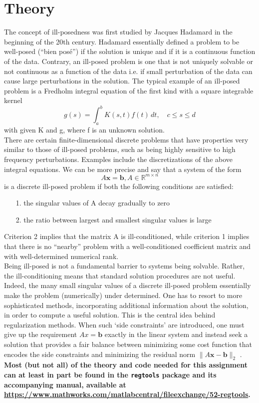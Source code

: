 \documentclass[12pt]{article}
\newcommand{\mbf}[1]{\mathbf{#1}}
\begin{document}
\section{Theory}
The concept of ill-posedness was first studied by Jacques Hadamard in the beginning of the 20th century. Hadamard essentially defined a problem to be well-posed (“bien posé”) if the solution is unique and if it is a continuous function of the data. Contrary, an ill-posed problem is one that is not
uniquely solvable or not continuous as a function of the data i.e. if small perturbation of the data can cause large perturbations in the solution.
The typical example of an ill-posed problem is a Fredholm integral equation of the first kind with a square integrable kernel
$$g(s)=\int_{a}^{b}K(s,t)f(t) \,d t,\quad c\leq s\leq d$$
with given K and g, where f is an unknown solution.\\
There are certain finite-dimensional discrete problems that have properties very similar to those of ill-posed problems, such as being highly sensitive to high frequency perturbations. Examples include the discretizations of the above integral equations. We can be more precise and say that a system of
the form
$$A\mathbf{x}=\mathbf{b}, A\in \mathbb{R}^{m\times n}$$
is a discrete ill-posed problem if both the following conditions are satisfied:
\begin{itemize}
\item[1.]the singular values of A decay gradually to zero
\item[2.]the ratio between largest and smallest singular values is large
\end{itemize}
Criterion 2 implies that the matrix A is ill-conditioned, while criterion 1 implies that there is no
“nearby” problem with a well-conditioned coefficient matrix and with well-determined numerical rank.\\
Being ill-posed is not a fundamental barrier to systems being solvable. Rather, the ill-conditioning
means that standard solution procedures are not useful. Indeed, the many small singular values of
a discrete ill-posed problem essentially make the problem (numerically) under determined. One has
to resort to more sophisticated methods, incorporating additional information about the solution, in
order to compute a useful solution. This is the central idea behind regularization methods. When such `side constraints’ are introduced, one must give up the requirement $Ax = \mbf{b}$ exactly in the linear system and instead seek a solution that provides a fair balance between minimizing some cost function that encodes the side constraints and minimizing the residual norm $\|A\mbf{x} -\mbf{b}\|_2$ .\\
\textbf{Most (but not all) of the theory and code needed for this assignment can at least in part be found in the \texttt{regtools} package and its accompanying manual, available at \url{https://www.mathworks.com/matlabcentral/fileexchange/52-regtools}.}
\end{document}
